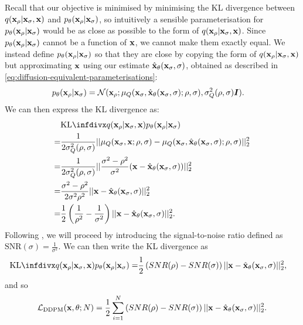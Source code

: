 Recall that our objective is minimised by minimising the KL divergence between $q({\mathbf{x}}_\rho|{\mathbf{x}}_\sigma,{\mathbf{x}})$ and $p_\theta({\mathbf{x}}_{\rho}|{\mathbf{x}}_{\sigma})$, so intuitively a sensible parameterisation for $p_\theta({\mathbf{x}}_\rho|{\mathbf{x}}_\sigma)$ would be as close as possible to the form of $q({\mathbf{x}}_\rho|{\mathbf{x}}_\sigma,{\mathbf{x}})$. Since $p_\theta({\mathbf{x}}_{\rho}|{\mathbf{x}}_{\sigma})$ cannot be a function of ${\mathbf{x}}$, we cannot make them exactly equal. We instead define $p_\theta({\mathbf{x}}_\rho|{\mathbf{x}}_\sigma)$ so that they are close by copying the form of $q({\mathbf{x}}_\rho|{\mathbf{x}}_\sigma,{\mathbf{x}})$ but approximating ${\mathbf{x}}$ using our estimate $\hat{{\mathbf{x}}}_\theta({\mathbf{x}}_\sigma, \sigma)$, obtained as described in \cref{eq:diffusion-equivalent-parameterisations}:
\begin{align}
    p_\theta({\mathbf{x}}_{\rho} | {\mathbf{x}}_{\sigma}) &= {\mathcal{N}}( {\mathbf{x}}_{\rho}; \mathbf{\mu}_Q({\mathbf{x}}_\sigma, \hat{{\mathbf{x}}}_\theta({\mathbf{x}}_\sigma, \sigma); \rho, \sigma), \sigma_Q^2(\rho, \sigma) {\bm{I}} ).
\end{align}
We can then express the KL divergence as:
\begin{align}
    &\kl{q(\rvx_{\rho} | \rvx_{\sigma}, \rvx)}{p_\theta(\rvx_{\rho} | \rvx_{\sigma})} \\ 
    = &\frac{1}{2 \sigma_Q^2(\rho, \sigma)} || \mathbf{\mu}_Q(\rvx_\sigma, \rvx; \rho, \sigma) - \mathbf{\mu}_Q(\rvx_\sigma, \predx_\theta(\rvx_\sigma, \sigma); \rho, \sigma) ||_2^2 \\
    = &\frac{1}{2 \sigma_Q^2(\rho, \sigma)} || \frac{\sigma^2-\rho^2}{\sigma^2} ( \rvx - \predx_\theta(\rvx_\sigma, \sigma) ) ||_2^2 \\
    = &\frac{\sigma^2-\rho^2}{2 \sigma^2 \rho^2} || \rvx - \predx_\theta(\rvx_\sigma, \sigma) ||_2^2 \\
    = &\frac{1}{2} \left( \frac{1}{\rho^2} - \frac{1}{\sigma^2} \right) || \rvx - \predx_\theta(\rvx_\sigma, \sigma) ||_2^2.
\end{align}
Following \citet{kingma2021variational}, we will proceed by introducing the signal-to-noise ratio defined as $\text{SNR}(\sigma) = \frac{1}{\sigma^2}$. We can then write the KL divergence as
\begin{align}
\kl{q(\rvx_{\rho} | \rvx_{\sigma}, \rvx)}{p_\theta(\rvx_{\rho} | \rvx_{\sigma})} = &\frac{1}{2} \left( SNR(\rho) - SNR(\sigma) \right) || \rvx - \predx_\theta(\rvx_\sigma, \sigma) ||_2^2,
\end{align}
and so
\begin{align}
    \mathcal{L}_\text{DDPM}({\mathbf{x}}, \theta; N) = \frac{1}{2} \sum_{i=1}^N \left( SNR(\rho) - SNR(\sigma) \right) || {\mathbf{x}} - \hat{{\mathbf{x}}}_\theta({\mathbf{x}}_\sigma, \sigma) ||_2^2.
\end{align}

